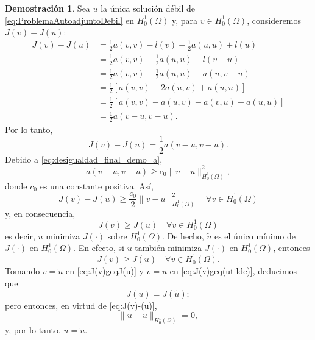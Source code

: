 \documentclass[a4paper,11pt,spanish, twoside, leqno]{tfg-uam}
\theoremstyle{definition}
\newtheorem{dem}[teor]{Demostración}
\begin{document}
\begin{dem}
    Sea $ u $ la única solución débil de \eqref{eq:ProblemaAutoadjuntoDebil} en $ H_0^1(\Omega) $ y, para $ v \in H_0^1(\Omega) $, consideremos $ J(v) - J(u) $:
    \begin{align*}
    J(v) - J(u) &= \frac{1}{2} a(v,v) - l(v) - \frac{1}{2} a(u,u) + l(u) \\
    &= \frac{1}{2} a(v,v) - \frac{1}{2} a(u,u) - l(v - u) \\
    &= \frac{1}{2} a(v,v) - \frac{1}{2} a(u,u) - a(u, v - u) \\
    &= \frac{1}{2} \left[ a(v,v) - 2a(u,v) + a(u,u) \right] \\
    &= \frac{1}{2} \left[ a(v,v) - a(u,v) - a(v,u) + a(u,u) \right] \\
    &= \frac{1}{2} a(v - u, v - u).
    \end{align*}
    Por lo tanto,
    \begin{equation*}
    J(v) - J(u) = \frac{1}{2} a(v - u, v - u).
    \end{equation*}
    Debido a \eqref{eq:desigualdad_final_demo_a},
    \begin{equation*}
    a(v - u, v - u) \geq c_0 \| v - u \|_{H_0^1(\Omega)}^2,
    \end{equation*}
    donde $ c_0 $ es una constante positiva. Así,
    \begin{equation}\label{eq:J(v)-(u)}
    J(v) - J(u) \geq \frac{c_0}{2} \| v - u \|_{H_0^1(\Omega)}^2 \quad \forall v \in H_0^1(\Omega)
    \end{equation}
    y, en consecuencia,
    \begin{equation}\label{eq:J(v)geqJ(u)}
    J(v) \geq J(u) \quad \forall v \in H_0^1(\Omega)
    \end{equation}
    es decir, $ u $ minimiza $ J(\cdot) $ sobre $ H_0^1(\Omega) $.
    De hecho, $ \tilde{u} $ es el único mínimo de $ J(\cdot) $ en $ H_0^1(\Omega) $. En efecto, si $ \tilde{u} $ también minimiza $ J(\cdot) $ en $ H_0^1 (\Omega) $, entonces
    \begin{equation}\label{eq:J(v)geq(utilde)}
    J(v) \geq J(\tilde{u}) \quad \forall v \in H_0^1(\Omega).
    \end{equation}
    Tomando $ v = \tilde{u} $ en \eqref{eq:J(v)geqJ(u)} y $ v = u $ en \eqref{eq:J(v)geq(utilde)}, deducimos que
    \begin{equation*}
    J(u) = J(\tilde{u});
    \end{equation*}
    pero entonces, en virtud de \eqref{eq:J(v)-(u)},
    \begin{equation*}
    \| \tilde{u} - u \|_{H_0^1(\Omega)} = 0,
    \end{equation*}
    y, por lo tanto, $ u = \tilde{u} $. 



\end{dem}
\end{document}
